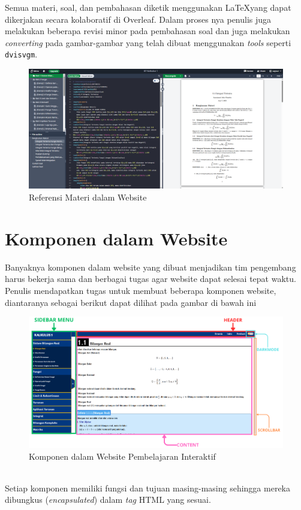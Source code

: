 \documentclass{file/KP-ITS}
\theoremstyle{definition}
\theoremstyle{definition}
\theoremstyle{plain}
\begin{document}
Semua materi, soal, dan pembahasan diketik menggunakan \LaTeX yang dapat dikerjakan secara kolaboratif di Overleaf. Dalam proses nya penulis juga melakukan beberapa revisi minor pada pembahasan soal dan juga melakukan \textit{converting} pada gambar-gambar yang telah dibuat menggunakan \textit{tools} seperti \texttt{dvisvgm}.

\begin{figure}[h!]
  \centering
  \includegraphics[width=\textwidth]{foto/Overleaf1.png}
  \caption{Referensi Materi dalam Website}
\end{figure}

\section{Komponen dalam Website}

Banyaknya komponen dalam website yang dibuat menjadikan tim pengembang harus bekerja sama dan berbagai tugas agar website dapat selesai tepat waktu. Penulis mendapatkan tugas untuk membuat beberapa komponen website, diantaranya sebagai berikut dapat dilihat pada gambar di bawah ini
\begin{figure}[h!]
  \centering
  \includegraphics[width=\textwidth]{foto/KomponenWeb.png}
  \caption{Komponen dalam Website Pembelajaran Interaktif}
\end{figure}\\
Setiap komponen memiliki fungsi dan tujuan masing-masing sehingga mereka dibungkus (\textit{encapsulated}) dalam \textit{tag} HTML yang sesuai.
\end{document}
